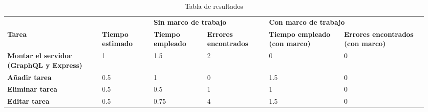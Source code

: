 \begin{table}[]
\centering
\caption{Tabla de resultados}
\label{tab:results}
\begin{adjustbox}{width=\columnwidth,center}
\begin{tabular}{llllll}
{\color[HTML]{000000} }                                                & {\color[HTML]{000000} }                         & \multicolumn{2}{l}{{\color[HTML]{000000} \textbf{Sin marco de trabajo}}}                              & \multicolumn{2}{l}{{\color[HTML]{000000} \textbf{Con marco de trabajo}}}                                                      \\
{\color[HTML]{000000} \textbf{Tarea}}                                  & {\color[HTML]{000000} \textbf{Tiempo estimado}} & {\color[HTML]{000000} \textbf{Tiempo empleado}} & {\color[HTML]{000000} \textbf{Errores encontrados}} & {\color[HTML]{000000} \textbf{Tiempo empleado (con marco)}} & {\color[HTML]{000000} \textbf{Errores encontrados (con marco)}} \\
{\color[HTML]{000000} \textbf{Montar el servidor (GraphQL y Express)}} & {\color[HTML]{000000} 1}                        & {\color[HTML]{000000} 1.5}                      & {\color[HTML]{000000} 2}                            & {\color[HTML]{000000} 0}                                    & {\color[HTML]{000000} 0}                                        \\
{\color[HTML]{000000} \textbf{Añadir tarea}}                           & {\color[HTML]{000000} 0.5}                      & {\color[HTML]{000000} 1}                        & {\color[HTML]{000000} 0}                            & {\color[HTML]{000000} 1.5}                                  & {\color[HTML]{000000} 0}                                        \\
{\color[HTML]{000000} \textbf{Eliminar tarea}}                         & {\color[HTML]{000000} 0.5}                      & {\color[HTML]{000000} 0.5}                      & {\color[HTML]{000000} 1}                            & {\color[HTML]{000000} 1}                                    & {\color[HTML]{000000} 0}                                        \\
{\color[HTML]{000000} \textbf{Editar tarea}}                           & {\color[HTML]{000000} 0.5}                      & {\color[HTML]{000000} 0.75}                     & {\color[HTML]{000000} 4}                            & {\color[HTML]{000000} 1.5}                                  & {\color[HTML]{000000} 0}                                        \\

\end{tabular}
\end{adjustbox}
\end{table}
